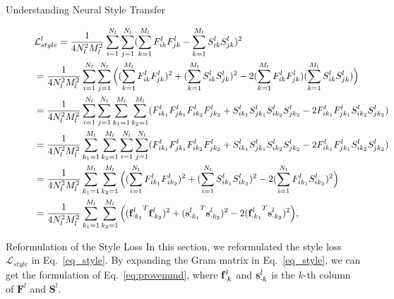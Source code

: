 \begin{section}{Understanding Neural Style Transfer}
\begin{figure*}[hbtp]
\begin{footnotesize}
\begin{equation}\label{eq:provemmd}
\begin{aligned}
&\mathcal{L}_{style}^l = \frac{1}{4N_l^2M_l^2}\sum_{i=1}^{N_l}\sum_{j=1}^{N_l}(\sum_{k=1}^{M_l}F_{ik}^lF_{jk}^l - \sum_{k=1}^{M_l}S_{ik}^lS_{jk}^l)^2\\
&=  \frac{1}{4N_l^2M_l^2}\sum_{i=1}^{N_l}\sum_{j=1}^{N_l}\Big( 
		(\sum_{k=1}^{M_l}F_{ik}^lF_{jk}^l)^2 +
		(\sum_{k=1}^{M_l}S_{ik}^lS_{jk}^l)^2 -
		2(\sum_{k=1}^{M_l}F_{ik}^lF_{jk}^l)(\sum_{k=1}^{M_l}S_{ik}^lS_{jk}^l) \Big)\\
&=  \frac{1}{4N_l^2M_l^2}\sum_{i=1}^{N_l}\sum_{j=1}^{N_l}\sum_{k_1=1}^{M_l}\sum_{k_2=1}^{M_l} ( F_{ik_1}^l F_{jk_1}^l F_{ik_2}^l F_{jk_2}^l + 
S_{ik_1}^l S_{jk_1}^l S_{ik_2}^l S_{jk_2}^l - 2 F_{ik_1}^l F_{jk_1}^l  S_{ik_2}^l S_{jk_2}^l)\\
&= \frac{1}{4N_l^2M_l^2}\sum_{k_1=1}^{M_l}\sum_{k_2=1}^{M_l} \sum_{i=1}^{N_l}\sum_{j=1}^{N_l} ( F_{ik_1}^l F_{jk_1}^l F_{ik_2}^l F_{jk_2}^l + 
S_{ik_1}^l S_{jk_1}^l S_{ik_2}^l S_{jk_2}^l - 2 F_{ik_1}^l F_{jk_1}^l  S_{ik_2}^l S_{jk_2}^l)\\
&= \frac{1}{4N_l^2M_l^2}\sum_{k_1=1}^{M_l}\sum_{k_2=1}^{M_l} 
   \Big( (\sum_{i=1}^{N_l}F_{ik_1}^lF_{ik_2}^l)^2 + 
         (\sum_{i=1}^{N_l}S_{ik_1}^lS_{ik_2}^l)^2 - 
         2(\sum_{i=1}^{N_l}F_{ik_1}^lS_{ik_2}^l)^2
   \Big)\\
&= \frac{1}{4N_l^2M_l^2}\sum_{k_1=1}^{M_l} \sum_{k_2=1}^{M_l} 
   \Big(  ({\col{\mathbf{f}^l}{k_1}}^T \col{\mathbf{f}^l}{k_2} )^2  + 
   		  ({\col{\mathbf{s}^l}{k_1}}^T \col{\mathbf{s}^l}{k_2} )^2  -
   		  2 ({\col{\mathbf{f}^l}{k_1}}^T \col{\mathbf{s}^l}{k_2} )^2 
   \Big),
\end{aligned}
\end{equation}
\end{footnotesize}
\vspace{-2mm}
\end{figure*}

\begin{subsection}{Reformulation of the Style Loss}
In this section, we reformulated the style loss $\mathcal{L}_{style}$ in Eq.~\ref{eq_style}. By expanding the Gram matrix in Eq.~\ref{eq_style}, we can get the formulation of Eq.~\ref{eq:provemmd}, where $\mathbf{f}^l_{\cdot k}$ and $\mathbf{s}^l_{\cdot k}$ is the $k$-th column of $\mathbf{F}^l$ and $\mathbf{S}^l$.


\end{subsection}
\end{section}
